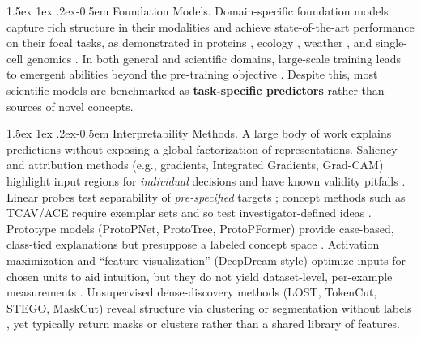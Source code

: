 \documentclass[10pt,twocolumn,letterpaper]{article}
\makeatletter
\renewcommand{\paragraph}{%
  \@startsection{paragraph}{4}%
  {\z@}{1.5ex \@plus 1ex \@minus .2ex}{-0.5em}%
  {\normalfont\normalsize\bfseries}%
}
\makeatother
\begin{document}
\paragraph{Foundation Models.}
Domain-specific foundation models capture rich structure in their modalities and achieve state-of-the-art performance on their focal tasks, as demonstrated in proteins \citep{abramson2024alphafold3,hayes2025esm3}, ecology \citep{stevens2024bioclip}, weather \citep{lam2023graphcast,price2025gencast}, and single-cell genomics \citep{cui2024scgpt}.
In both general and scientific domains, large-scale training leads to emergent abilities beyond the pre-training objective \citep{wei2022emergent,gu2025bioclip2}.
Despite this, most scientific models are benchmarked as \textbf{task-specific predictors} rather than sources of novel concepts.

\paragraph{Interpretability Methods.}
A large body of work explains predictions without exposing a global factorization of representations.
Saliency and attribution methods (e.g., gradients, Integrated Gradients, Grad-CAM) highlight input regions for \emph{individual} decisions and have known validity pitfalls \citep{simonyan2014deep,sundararajan2017axiomatic,selvaraju2017gradcam,adebayo2018sanity}.
Linear probes test separability of \emph{pre-specified} targets \citep{alain2017probes,hewitt2019control}; concept methods such as TCAV/ACE require exemplar sets and so test investigator-defined ideas \citep{kim2018tcav,ghorbani2019ace}.
Prototype models (ProtoPNet, ProtoTree, ProtoPFormer) provide case-based, class-tied explanations but presuppose a labeled concept space \citep{chen2019protopnet,nauta2021prototree,protopformer2022}.
Activation maximization and “feature visualization” (DeepDream-style) optimize inputs for chosen units to aid intuition, but they do not yield dataset-level, per-example measurements \citep{mahendran2016visualize,nguyen2016dgn,olah2017feature}.
Unsupervised dense-discovery methods (LOST, TokenCut, STEGO, MaskCut) reveal structure via clustering or segmentation without labels \citep{lost2021,ji2021tokencut,stego2022,maskcut2022}, yet typically return masks or clusters rather than a shared library of features.
\end{document}
